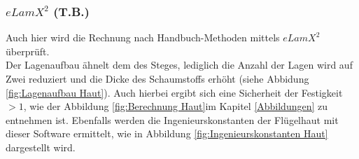 \subsubsection{$eLamX^{2}$ (T.B.)}

Auch hier wird die Rechnung nach Handbuch-Methoden mittels $eLamX^{2}$ überprüft. \\

\noindent Der Lagenaufbau ähnelt dem des Steges, lediglich die Anzahl der Lagen wird auf Zwei reduziert und die Dicke des Schaumstoffs erhöht (siehe Abbidung \ref{fig:Lagenaufbau Haut}). Auch hierbei ergibt sich eine Sicherheit der Festigkeit $>1$, wie der Abbildung \ref{fig:Berechnung Haut}im  Kapitel \ref{Abbildungen} zu entnehmen ist. Ebenfalls werden die Ingenieurskonstanten der Flügelhaut mit dieser Software ermittelt, wie in Abbildung \ref{fig:Ingenieurskonstanten Haut} dargestellt wird.
